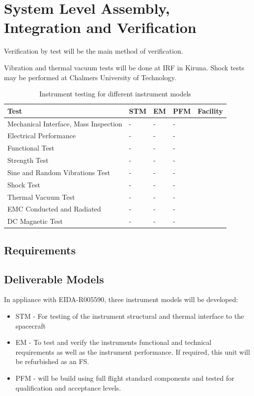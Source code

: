 \section{System Level Assembly, Integration and Verification}
Verification by test will be the main method of verification.

Vibration and thermal vacuum tests will be done at IRF in Kiruna. Shock tests may be performed at Chalmers University of Technology\cite{Jonsson}. 
%
\begin{table}[H]
\centering
\caption{Instrument testing for different instrument models}
\label{tab:instrument_testing}
\begin{tabular}{p{}p{}p{}p{}p{}}
\hline
\textbf{Test} & \textbf{STM} & \textbf{EM} & \textbf{PFM} & \textbf{Facility}\\
\hline
Mechanical Interface, Mass Inspection & - & - & - & \\
Electrical Performance & - & - & - & \\
Functional Test & - & - & - & \\
Strength Test & - & - & - & \\
Sine and Random Vibrations Test & - & - & - & \\
Shock Test & - & - & - & \\
Thermal Vacuum Test & - & - & - &\\
EMC Conducted and Radiated & - & - & - & \\
DC Magnetic Test & - & - & - &\\
\hline
\end{tabular}
\end{table}

%
\subsection{Requirements}
\subsection{Deliverable Models}
%
In appliance with EIDA-R005590\cite{EIDA}, three instrument models will be developed:
\begin{itemize}
\item \ac{STM} - For testing of the instrument structural and thermal interface to the spacecraft\\
\item \ac{EM} - To test and verify the instruments functional and technical requirements as well as the instrument performance. If required, this unit will be refurbished as an \ac{FS}.\\
\item \ac{PFM} - will be build using full flight standard components and tested for qualification and acceptance levels.
\end{itemize}
%
